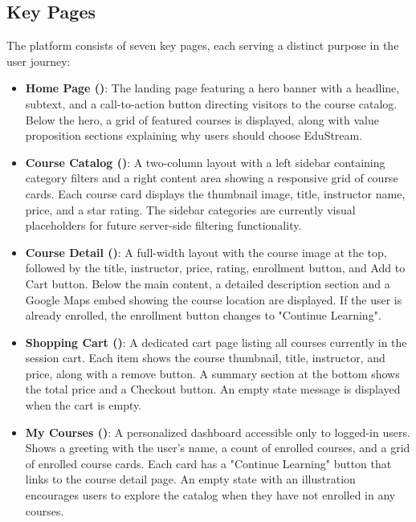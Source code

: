 \documentclass[12pt,a4paper]{report}
\begin{document}
\subsection{Key Pages}

The platform consists of seven key pages, each serving a distinct purpose in the user journey:

\begin{itemize}
    \item \textbf{Home Page (\code{/})}: The landing page featuring a hero banner with a headline, subtext, and a call-to-action button directing visitors to the course catalog. Below the hero, a grid of featured courses is displayed, along with value proposition sections explaining why users should choose EduStream.
    
    \item \textbf{Course Catalog ()}: A two-column layout with a left sidebar containing category filters and a right content area showing a responsive grid of course cards. Each course card displays the thumbnail image, title, instructor name, price, and a star rating. The sidebar categories are currently visual placeholders for future server-side filtering functionality.
    
    \item \textbf{Course Detail ()}: A full-width layout with the course image at the top, followed by the title, instructor, price, rating, enrollment button, and Add to Cart button. Below the main content, a detailed description section and a Google Maps embed showing the course location are displayed. If the user is already enrolled, the enrollment button changes to "Continue Learning".
    
    \item \textbf{Shopping Cart ()}: A dedicated cart page listing all courses currently in the session cart. Each item shows the course thumbnail, title, instructor, and price, along with a remove button. A summary section at the bottom shows the total price and a Checkout button. An empty state message is displayed when the cart is empty.
    
    \item \textbf{My Courses ()}: A personalized dashboard accessible only to logged-in users. Shows a greeting with the user's name, a count of enrolled courses, and a grid of enrolled course cards. Each card has a "Continue Learning" button that links to the course detail page. An empty state with an illustration encourages users to explore the catalog when they have not enrolled in any courses.
    

\end{itemize}
\end{document}
